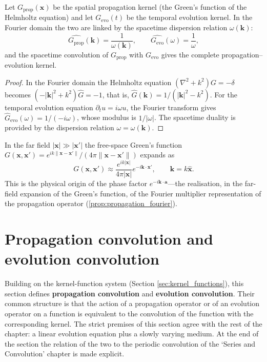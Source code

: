 \begin{theorem}\label{thm:propagation_evolution_duality}
Let $G_{\text{prop}}(\mathbf{x})$ be the spatial propagation kernel (the Green's function of the Helmholtz equation) and let $G_{\text{evo}}(t)$ be the temporal evolution kernel. In the Fourier domain the two are linked by the spacetime dispersion relation $\omega(\mathbf{k})$:
\[
\widehat{G_{\text{prop}}}(\mathbf{k}) = \frac{1}{\omega(\mathbf{k})}, \qquad \widehat{G_{\text{evo}}}(\omega) = \frac{1}{\omega},
\]
and the spacetime convolution of $G_{\text{prop}}$ with $G_{\text{evo}}$ gives the complete propagation--evolution kernel.
\end{theorem}

\begin{proof}
In the Fourier domain the Helmholtz equation $(\nabla^2+k^2)G = -\delta$ becomes $(-|\mathbf{k}|^2+k^2)\hat G = -1$, that is, $\hat G(\mathbf{k}) = 1/(|\mathbf{k}|^2-k^2)$. For the temporal evolution equation $\partial_t u = i\omega u$, the Fourier transform gives $\hat G_{\text{evo}}(\omega) = 1/(-i\omega)$, whose modulus is $1/|\omega|$. The spacetime duality is provided by the dispersion relation $\omega = \omega(\mathbf{k})$.
\end{proof}

\begin{example}\label{ex:green_far_field}
In the far field $|\mathbf{x}|\gg|\mathbf{x}'|$ the free-space Green's function $G(\mathbf{x},\mathbf{x}') = e^{ik\|\mathbf{x}-\mathbf{x}'\|}/(4\pi\|\mathbf{x}-\mathbf{x}'\|)$ expands as
\[
G(\mathbf{x},\mathbf{x}') \approx \frac{e^{ik|\mathbf{x}|}}{4\pi|\mathbf{x}|}e^{-i\mathbf{k}\cdot\mathbf{x}'}, \qquad \mathbf{k} = k\hat{\mathbf{x}}.
\]
This is the physical origin of the phase factor $e^{-i\mathbf{k}\cdot\mathbf{a}}$---the realisation, in the far-field expansion of the Green's function, of the Fourier multiplier representation of the propagation operator (\cref{prop:propagation_fourier}).
\end{example}

\section{Propagation convolution and evolution convolution}\label{sec:propagation_convolution}

\begin{remark}\label{rem:convolution_section_positioning}
Building on the kernel-function system (Section \ref{sec:kernel_functions}), this section defines \textbf{propagation convolution} and \textbf{evolution convolution}. Their common structure is that the action of a propagation operator or of an evolution operator on a function is equivalent to the convolution of the function with the corresponding kernel. The strict premises of this section agree with the rest of the chapter: a linear evolution equation plus a slowly varying medium. At the end of the section the relation of the two to the periodic convolution of the `Series and Convolution' chapter is made explicit.
\end{remark}

